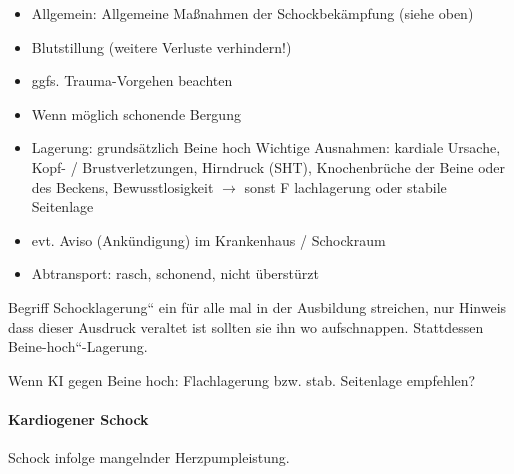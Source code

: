 \documentclass{article}
\begin{document}
\begin{itemize}
\item Allgemein: Allgemeine Ma{\ss}nahmen der Schockbek\"ampfung (siehe
oben) 

\item Blutstillung  (weitere Verluste verhindern!)

\item ggfs. Trauma-Vorgehen beachten

\item %
%
Wenn m\"oglich schonende Bergung

\item Lagerung: grunds\"atzlich %
%
Beine hoch  Wichtige Ausnahmen: {\textperiodcentered} kardiale Ursache,
{\textperiodcentered} Kopf- / Brust\-ver\-letzungen,
{\textperiodcentered} Hirndruck (SHT),  {\textperiodcentered}
Knochenbr\"uche der Beine oder des Beckens, {\textperiodcentered}
Bewusstlosigkeit ${\rightarrow}$ sonst F%
%
lachlagerung oder stabile Seitenlage

\item evt. Aviso (Ank\"undigung) im  Krankenhaus / Schockraum

\item Abtransport: rasch, schonend, nicht \"uberst\"urzt

\end{itemize}
Begriff {\quotedblbase}Schocklagerung{\textquotedblleft} ein f\"ur alle
mal in der Ausbildung streichen, nur Hinweis dass dieser Ausdruck
veraltet ist sollten sie ihn wo aufschnappen. Stattdessen
{\quotedblbase}Beine-hoch{\textquotedblleft}-Lagerung.

Wenn KI gegen Beine hoch: Flachlagerung bzw. stab. Seitenlage empfehlen?

\paragraph{Kardiogener Schock}
Schock infolge mangelnder Herzpumpleistung.
\end{document}
